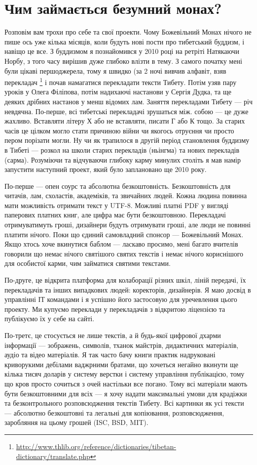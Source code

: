 \section{Чим займається безумний монах?}

Розповім вам трохи про себе та свої проекти.
Чому Божевільний Монах нічого не пише ось уже
кілька місяців, коли будуть нові пости про
тибетський буддизм, і навіщо це все. З
буддизмом я познайомився у 2010 році на ретріті
Натякаючи Норбу, з того часу вирішив дуже глибоко влізти в тему.
З самого початку мені були цікаві першоджерела,
тому я швидко (за 2 ночі вивчив алфавіт, взяв
перекладач \footnote{\url{http://www.thlib.org/reference/dictionaries/tibetan-dictionary/translate.php}}
і почав намагатися перекладати тексти Тибету.
Потім узяв пару уроків у Олега Філіпова, потім
надихаючі настанови у Сергія Дудка, та ще
деяких дрібних настанов у менш відомих лам.
Заняття перекладами Тибету --- річ невдячна.
По-перше, всі тибетські перекладачі зрушаться між.
собою --- це дуже жахливо. Вставляти літеру Х або
не вставляти, писати Г або К тощо.
За старих часів це цілком могло стати причиною
війни чи якогось отруєння чи просто пером
порізати могли. Ну чи як трапилося в другій
період становлення буддизму в Тибеті --- розкол
на школи старих перекладів (ньінгма) та нових
перекладів (сарма). Розуміючи та відчуваючи глибоку
карму минулих століть я мав намір запустити
наступний проект, який було заплановано ще 2010 року.

По-перше — опен соурс та абсолютна безкоштовність.
Безкоштовність для читачів, лам, схоластів, академіків,
та звичайних людей. Кожна людина повинна мати можливість
отримати текст у UTF-8. Можливі платні PDF у вигляді
паперових платних книг, але цифра має бути безкоштовною.
Перекладачі отримуватимуть гроші, дизайнери будуть
отримувати гроші, але люди не повинні платити нічого.
Поки що єдиний самовладний спонсор --- Божевільний Монах.
Якщо хтось хоче вкинутися баблом --- ласкаво просимо,
мені багато вчителів говорили що немає нічого святішого
святих текстів і немає нічого кориснішого для особистої
карми, чим займатися святими текстами.

По-друге, це відкрита платформа для колаборації різних шкіл,
ліній передачі, їх перекладачів та інших випадкових людей:
коректорів, дизайнерів. Я маю досвід в управлінні ІТ командами
і я успішно його застосовую для уречевлення цього проекту.
Ми купуємо переклади у перекладачів з відкритою ліцензією
та публікуємо їх у себе на сайті.

По-третє, це стосується не лише текстів, а й будь-якої цифрової
дхарми інформації --- зображень, символів, тханок майстрів,
дидактичних матеріалів, аудіо та відео матеріалів. Я так часто
бачу книги практик надруковані криворукими дебілами ваджрними
братами, що хочеться негайно вкинути ще кілька тисяч доларів
у систему верстки і систему управління публікацією, тому що
кров просто сочиться з очей настільки все погано. Тому всі
матеріали мають бути безкоштовними для всіх --- я хочу надати
максимальні умови для крадіжки та безконтрольного розповсюдження
текстів Тибету. Всі картинки як усі тексти --- абсолютно
безкоштовні та легальні для копіювання, розповсюдження,
заробляння на цьому грошей (ISC, BSD, MIT).

